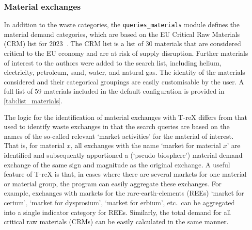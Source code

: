 \documentclass{article}
\renewcommand{\texttt}[1]{{\ttfamily\small\nolinkurl{#1}}}
\begin{document}
\subsubsection{Material exchanges}\label{sec:method-T-reX-material_exchanges}
In addition to the waste categories, the \texttt{queries\_materials} module defines the material demand categories, which are based on the EU Critical Raw Materials (CRM) list for 2023~\citep{eu2023crmstudy}. The CRM list is a list of 30 materials that are considered critical to the EU economy and are at risk of supply disruption. Further materials of interest to the authors were added to the search list, including helium, electricity, petroleum, sand, water, and natural gas. The identity of the materials considered and their categorical groupings are easily customisable by the user. A full list of 59 materials included in the default configuration is provided in \autoref{tab:list_materials}.

The logic for the identification of material exchanges with T-reX differs from that used to identify waste exchanges in that the search queries are based on the names of the so-called relevant `market activities' for the material of interest. That is, for material $x$, all exchanges with the name `market for material $x$' are identified and subsequently apportioned a (`pseudo-biosphere') material demand exchange of the same sign and magnitude as the original exchange. A useful feature of T-reX is that, in cases where there are several markets for one material or material group, the program can easily aggregate these exchanges. For example, exchanges with markets for the rare-earth-elements (REEs) `market for cerium', `market for dysprosium', `market for erbium', etc.\ can be aggregated into a single indicator category for REEs. Similarly, the total demand for all critical raw materials (CRMs) can be easily calculated in the same manner.
\end{document}
